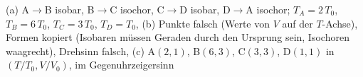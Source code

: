 (a) A$\to$B isobar, B$\to$C isochor, C$\to$D isobar, D$\to$A isochor; $T_A = 2\,T_0$, $T_B = 6\,T_0$, $T_C = 3\,T_0$, $T_D = T_0$, (b) Punkte falsch (Werte von $V$ auf der $T$-Achse), Formen kopiert (Isobaren müssen Geraden durch den Ursprung sein, Isochoren waagrecht), Drehsinn falsch, (c) A$(2,1)$, B$(6,3)$, C$(3,3)$, D$(1,1)$ in $(T/T_0, V/V_0)$, im Gegenuhrzeigersinn
